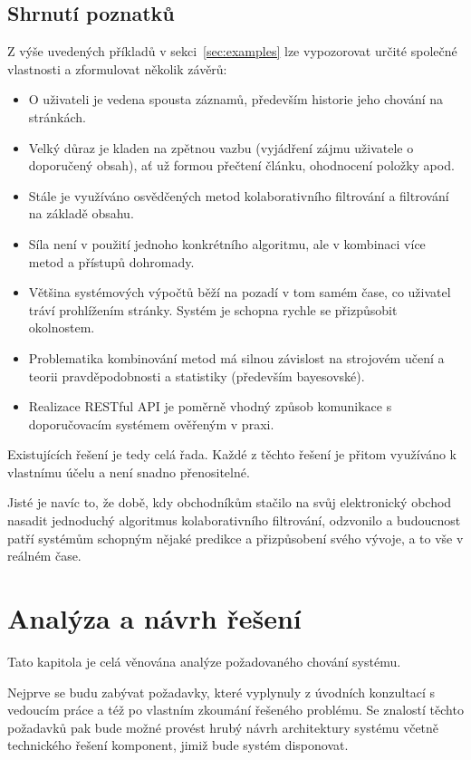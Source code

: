 \documentclass[thesis=M,czech]{FITthesis}[2014/05/07]
\begin{document}
\section{Shrnutí poznatků}

Z výše uvedených příkladů v sekci~\ref{sec:examples} lze vypozorovat určité společné vlastnosti a zformulovat několik závěrů:

\begin{itemize}
	\item O uživateli je vedena spousta záznamů, především historie jeho chování na stránkách.
	\item Velký důraz je kladen na zpětnou vazbu (vyjádření zájmu uživatele o doporučený obsah), ať už formou přečtení článku, ohodnocení položky apod.
	\item Stále je využíváno osvědčených metod kolaborativního filtrování a filtrování na základě obsahu.
	\item Síla není v použití jednoho konkrétního algoritmu, ale v kombinaci více metod a přístupů dohromady.
	\item Většina systémových výpočtů běží na pozadí v tom samém čase, co uživatel tráví prohlížením stránky. Systém je schopna rychle se přizpůsobit okolnostem.
	\item Problematika kombinování metod má silnou závislost na strojovém učení a teorii pravděpodobnosti a statistiky (především bayesovské).
	\item Realizace RESTful API je poměrně vhodný způsob komunikace s doporučovacím systémem ověřeným v praxi.
\end{itemize}

Existujících řešení je tedy celá řada. Každé z těchto řešení je přitom využíváno k vlastnímu účelu a není snadno přenositelné.

Jisté je navíc to, že době, kdy obchodníkům stačilo na svůj elektronický obchod nasadit jednoduchý algoritmus kolaborativního filtrování, odzvonilo a budoucnost patří systémům schopným nějaké predikce a přizpůsobení svého vývoje, a to vše v reálném čase. 

\chapter{Analýza a návrh řešení}
\label{chap:analysis}

Tato kapitola je celá věnována analýze požadovaného chování systému.

Nejprve se budu zabývat požadavky, které vyplynuly z úvodních konzultací s vedoucím práce a též po vlastním zkoumání řešeného problému. Se znalostí těchto požadavků pak bude možné provést hrubý návrh architektury systému včetně technického řešení komponent, jimiž bude systém disponovat.
\end{document}
